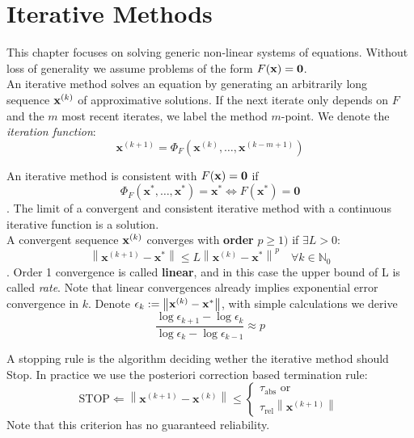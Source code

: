 \columnbreak
\part{Iterative Methods}
\setcounter{section}{0}

This chapter focuses on solving generic non-linear systems of equations. 
Without loss of generality we assume problems of the form $F(\mathbf{x})=\mathbf{0}$. \\

 An iterative method solves an equation by generating an arbitrarily long sequence $\mathbf{x}^{(k)}$ of approximative solutions. If the next iterate only depends on $F$ and the $m$ most recent iterates, we label the method $m$-point. We denote the \textit{iteration function}:
$$ \mathbf{x}^{(k+1)}=\Phi_{F}\left(\mathbf{x}^{(k)}, \ldots, \mathbf{x}^{(k-m+1)}\right) $$

 An iterative method is consistent with $F(\mathbf{x})=\mathbf{0}$ if
$$ \Phi_{F}\left(\mathbf{x}^{*}, \ldots, \mathbf{x}^{*}\right)=\mathbf{x}^{*} \Longleftrightarrow F\left(\mathbf{x}^{*}\right)=\mathbf{0} $$.
The limit of a convergent and consistent iterative method with a continuous iterative function is a solution. \\

 A convergent sequence $\mathbf{x}^{(k)}$ converges with \textbf{order} $p\geq 1)$ if $\exists L>0:$
$$\left\|\mathbf{x}^{(k+1)}-\mathbf{x}^{*}\right\| \leq L\left\|\mathbf{x}^{(k)}-\mathbf{x}^{*}\right\|^{p} \quad \forall k \in \mathbb{N}_{0} $$.
Order 1 convergence is called \textbf{linear}, and in this case the upper bound of L is called \textit{rate}. Note that linear convergences already implies exponential error convergence in $k$. 
Denote $\epsilon_k := \left\lVert \mathbf{x}^{(k)}-\mathbf{x}^{*} \right\rVert$, with simple calculations we derive
$$\frac{\log \epsilon_{k+1}-\log \epsilon_{k}}{\log \epsilon_{k}-\log \epsilon_{k-1}} \approx p$$

A stopping rule is the algorithm deciding wether the iterative method should Stop. In practice we use the posteriori correction based termination rule:
$$\text{STOP} \Leftarrow 
\left\|\mathbf{x}^{(k+1)}-\mathbf{x}^{(k)}\right\| \leq\left\{\begin{array}{c}
\tau_{\mathrm{abs}} \text{  or} \\
\tau_{\mathrm{rel}}\left\|\mathbf{x}^{(k+1)}\right\|
\end{array}\right.
$$
Note that this criterion has no guaranteed reliability.



